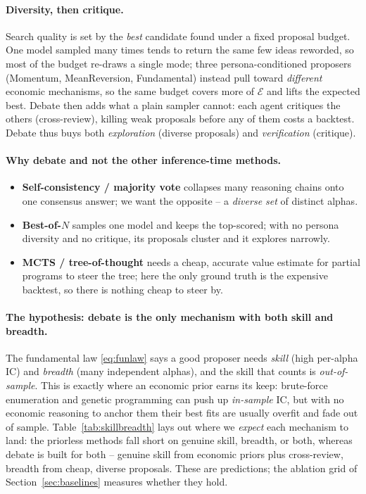 \documentclass[11pt]{article}
\theoremstyle{definition}
\theoremstyle{plain}
\theoremstyle{remark}
\newcommand{\Expr}{\mathcal{E}}
\newcommand{\IC}{\mathrm{IC}}
\begin{document}
\paragraph{Diversity, then critique.} Search quality is set by the \emph{best} candidate found
under a fixed proposal budget. One model sampled many times tends to return the same few ideas
reworded, so most of the budget re-draws a single mode; three persona-conditioned proposers
(Momentum, MeanReversion, Fundamental) instead pull toward \emph{different} economic mechanisms,
so the same budget covers more of $\Expr$ and lifts the expected best. Debate then adds what a
plain sampler cannot: each agent critiques the others (cross-review), killing weak proposals
before any of them costs a backtest. Debate thus buys both \emph{exploration} (diverse
proposals) and \emph{verification} (critique).

\paragraph{Why debate and not the other inference-time methods.}
\begin{itemize}[leftmargin=1.4em,itemsep=2pt]
  \item \textbf{Self-consistency / majority vote} collapses many reasoning chains onto one
  consensus answer; we want the opposite -- a \emph{diverse set} of distinct alphas.
  \item \textbf{Best-of-$N$} samples one model and keeps the top-scored; with no persona
  diversity and no critique, its proposals cluster and it explores narrowly.
  \item \textbf{MCTS / tree-of-thought} needs a cheap, accurate value estimate for partial
  programs to steer the tree; here the only ground truth is the expensive backtest, so there is
  nothing cheap to steer by.
\end{itemize}

\paragraph{The hypothesis: debate is the only mechanism with both skill and breadth.} The
fundamental law \eqref{eq:funlaw} says a good proposer needs \emph{skill} (high per-alpha $\IC$)
and \emph{breadth} (many independent alphas), and the skill that counts is \emph{out-of-sample}.
This is exactly where an economic prior earns its keep: brute-force enumeration and genetic
programming can push up \emph{in-sample} $\IC$, but with no economic reasoning to anchor them
their best fits are usually overfit and fade out of sample. Table~\ref{tab:skillbreadth} lays out
where we \emph{expect} each mechanism to land: the priorless methods fall short on genuine skill,
breadth, or both, whereas debate is built for both -- genuine skill from economic priors plus
cross-review, breadth from cheap, diverse proposals. These are predictions; the ablation grid of
Section~\ref{sec:baselines} measures whether they hold.
\end{document}
